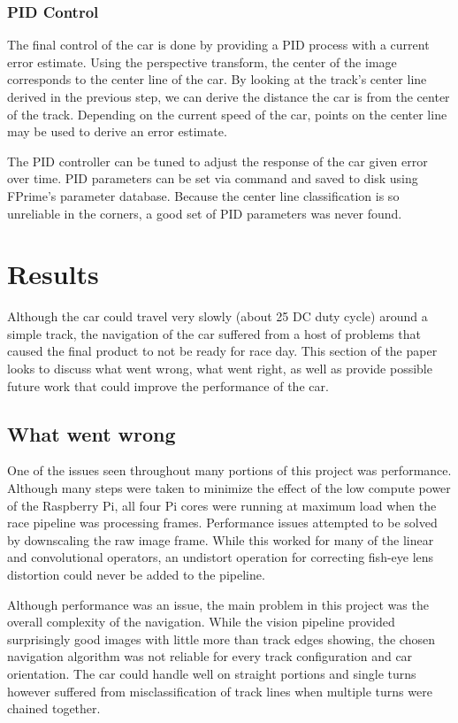 \documentclass{article}
\begin{document}

\subsubsection{PID Control}

The final control of the car is done by providing a PID process with a current error estimate. Using the perspective transform, the center of the image corresponds to the center line of the car. By looking at the track's center line derived in the previous step, we can derive the distance the car is from the center of the track. Depending on the current speed of the car, points on the center line may be used to derive an error estimate.

The PID controller can be tuned to adjust the response of the car given error over time. PID parameters can be set via command and saved to disk using FPrime's parameter database. Because the center line classification is so unreliable in the corners, a good set of PID parameters was never found.

\section{Results}

Although the car could travel very slowly (about 25 DC duty cycle) around a simple track, the navigation of the car suffered from a host of problems that caused the final product to not be ready for race day. This section of the paper looks to discuss what went wrong, what went right, as well as provide possible future work that could improve the performance of the car.

\subsection{What went wrong}

One of the issues seen throughout many portions of this project was performance. Although many steps were taken to minimize the effect of the low compute power of the Raspberry Pi, all four Pi cores were running at maximum load when the race pipeline was processing frames. Performance issues attempted to be solved by downscaling the raw image frame. While this worked for many of the linear and convolutional operators, an undistort operation for correcting fish-eye lens distortion could never be added to the pipeline.

Although performance was an issue, the main problem in this project was the overall complexity of the navigation. While the vision pipeline provided surprisingly good images with little more than track edges showing, the chosen navigation algorithm was not reliable for every track configuration and car orientation. The car could handle well on straight portions and single turns however suffered from misclassification of track lines when multiple turns were chained together.
\end{document}
